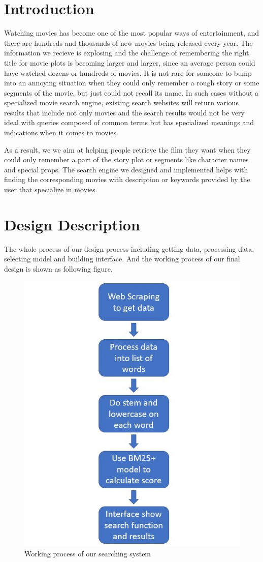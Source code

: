 \documentclass[sigconf,nonacm]{acmart}
\begin{document}
\section{Introduction}

Watching movies has become one of the most popular ways of entertainment, and there are hundreds and thousands of new movies being released every year. The information we recieve is explosing and the challenge of remembering the right title for movie plots is becoming larger and larger, since an average person could have watched dozens or hundreds of movies. It is not rare for someone to bump into an annoying situation when they could only remember a rough story or some segments of the movie, but just could not recall its name. In such cases without a specialized movie search engine, existing search websites will return various results that include not only movies and the search results would not be very ideal with queries composed of common terms but has specialized meanings and indications when it comes to movies.

As a result, we we aim at helping people retrieve the film they want when they could only remember a part of the story plot or segments like character names and special props. The search engine we designed and implemented helps with finding the corresponding movies with description or keywords provided by the user that specialize in movies.

\section{Design Description}

The whole process of our design process including getting data, processing data, selecting model and building interface. And the working process of our final design is shown as following figure,

\begin{figure}[H]
  \centering
  \includegraphics[width=0.5\linewidth]{process.jpg}
  \caption{Working process of our searching system}
\end{figure}
\end{document}
